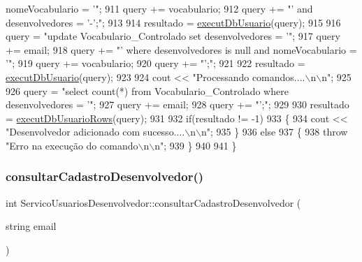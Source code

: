 \begin{DoxyCode}
{       nomeVocabulario = '"};
911         query += vocabulario;
912         query += \textcolor{stringliteral}{"' and desenvolvedores = '-';"};
913 
914         resultado = \mbox{\hyperlink{comando_sql_8cpp_a748197580e7f9acdbf48c78de1f7924b}{executDbUsuario}}(query);
915 
916         query = \textcolor{stringliteral}{"update Vocabulario\_Controlado set desenvolvedores = '"};
917         query += email;
918         query += \textcolor{stringliteral}{"' where desenvolvedores is null and nomeVocabulario = '"};
919         query += vocabulario;
920         query += \textcolor{stringliteral}{"';"};
921 
922         resultado = \mbox{\hyperlink{comando_sql_8cpp_a748197580e7f9acdbf48c78de1f7924b}{executDbUsuario}}(query);
923 
924         cout << \textcolor{stringliteral}{"Processando comandos....\(\backslash\)n\(\backslash\)n"};
925 
926         query = \textcolor{stringliteral}{"select count(*) from Vocabulario\_Controlado where desenvolvedores = '"};
927         query += email;
928         query += \textcolor{stringliteral}{"';"};
929 
930           resultado = \mbox{\hyperlink{comando_sql_8cpp_af54952694f2fa7d76f969fb74b853cb9}{executDbUsuarioRows}}(query);
931 
932           \textcolor{keywordflow}{if}(resultado != -1)
933           \{
934             cout << \textcolor{stringliteral}{"Desenvolvedor adicionado com sucesso....\(\backslash\)n\(\backslash\)n"};
935           \}
936           \textcolor{keywordflow}{else}
937           \{
938             \textcolor{keywordflow}{throw} \textcolor{stringliteral}{"Erro na execução do comando\(\backslash\)n\(\backslash\)n"};
939           \}
940 
941 \}
\end{DoxyCode}
\mbox{\label{class_servico_usuarios_desenvolvedor_a552cca1c14e7c9dd87600062d524ffa8}} 
\subsubsection{\texorpdfstring{consultar\+Cadastro\+Desenvolvedor()}{consultarCadastroDesenvolvedor()}}
{\footnotesize\ttfamily int Servico\+Usuarios\+Desenvolvedor\+::consultar\+Cadastro\+Desenvolvedor (\begin{DoxyParamCaption}\item[{string}]{email }\end{DoxyParamCaption})\hspace{0.3cm}{\ttfamily [virtual]}}

